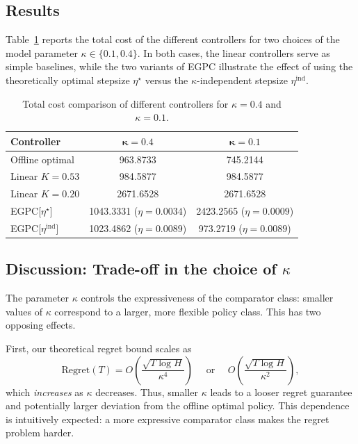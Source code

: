 \subsection{Results}

Table~\ref{tab:kappa_results} reports the total cost of the different controllers for two
choices of the model parameter $\kappa \in \{0.1, 0.4\}$. In both cases, the linear
controllers serve as simple baselines, while the two variants of EGPC illustrate the
effect of using the theoretically optimal stepsize $\eta^\star$ versus the
$\kappa$-independent stepsize $\eta^{\mathrm{ind}}$.

\begin{table}[H]
\centering
\caption{Total cost comparison of different controllers for $\kappa = 0.4$ and $\kappa = 0.1$.}
\label{tab:kappa_results}
\begin{tabular}{lcc}
\hline
\textbf{Controller} 
    & $\boldsymbol{\kappa = 0.4}$ 
    & $\boldsymbol{\kappa = 0.1}$ \\
\hline
Offline optimal          
    & 963.8733 
    & 745.2144 \\[0.2em]
Linear $K = 0.53$        
    & 984.5877 
    & 984.5877 \\[0.2em]
Linear $K = 0.20$        
    & 2671.6528 
    & 2671.6528 \\[0.2em]
EGPC[$\eta^\star$]       
    & 1043.3331 \; ($\eta = 0.0034$) 
    & 2423.2565 \; ($\eta = 0.0009$) \\[0.2em]
EGPC[$\eta^{\mathrm{ind}}$] 
    & 1023.4862 \; ($\eta = 0.0089$) 
    & 973.2719 \; ($\eta = 0.0089$) \\
\hline
\end{tabular}
\end{table}

\subsection{Discussion: Trade-off in the choice of $\kappa$}

The parameter $\kappa$ controls the expressiveness of the comparator class: smaller
values of $\kappa$ correspond to a larger, more flexible policy class. This has two
opposing effects.

First, our theoretical regret bound scales as
\[
    \mathrm{Regret}(T) = O\!\left( \frac{\sqrt{T \log H}}{\kappa^4} \right)\quad  \text{ or }\quad O\!\left( \frac{\sqrt{T \log H}}{\kappa^2} \right),
\]
which \emph{increases} as $\kappa$ decreases. Thus, smaller $\kappa$ leads to a looser
regret guarantee and potentially larger deviation from the offline optimal policy.
This dependence is intuitively expected: a more expressive comparator class makes the
regret problem harder.

